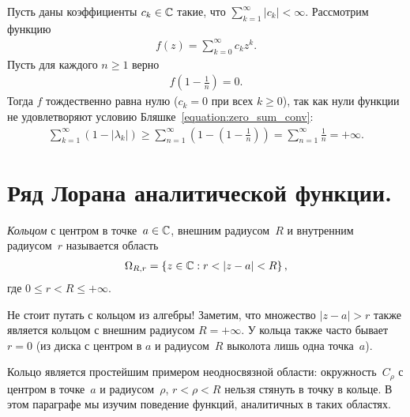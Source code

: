 \documentclass[../complex-analysis.tex]{subfiles}
\begin{document}
\begin{exmpl}
 Пусть даны коэффициенты $ c_k \in \mathbb{C} $ такие, что $ \sum_{k=1}^{\infty} \left| c_k \right| < \infty $. Рассмотрим функцию
 \begin{align*}
  f(z) = \sum_{k=0}^{\infty} c_k z^{k}.
 \end{align*} Пусть для каждого $ n \geqslant 1 $  верно
 \begin{align*}
  f \left( 1 - \frac{1}{n} \right) = 0.
 \end{align*} Тогда $ f $  тождественно равна нулю ($ c_k = 0 $ при всех $ k \geqslant 0 $), так как нули функции не удовлетворяют условию Бляшке~\eqref{equation:zero_sum_conv}:
 \begin{align*}
  \sum_{k=1}^{\infty} (1 - \left| \lambda_k \right|) \geqslant \sum_{n=1}^{\infty} \left( 1 - \left( 1 - \frac{1}{n} \right) \right) = \sum_{n=1}^{\infty} \frac{1}{n} = +\infty.
 \end{align*}
\end{exmpl}

\newpage
\section{Ряд Лорана аналитической функции.}

\begin{df}
 \label{def:Ring}
 \emph{Кольцом} с центром в точке~$ a\in\mathbb{C}$, внешним радиусом~$ R $ и внутренним радиусом~$ r $ называется область
 \begin{align*}
  \Omega_{R,r} = \left\{ z \in \mathbb{C} : r < \left| z-a \right| < R \right\},
 \end{align*} где $ 0 \leqslant r < R \leqslant +\infty $.
\end{df}

Не стоит путать с кольцом из алгебры! Заметим, что множество $ \left| z - a \right| > r $ также является кольцом с внешним радиусом $ R = +\infty $. У кольца также часто бывает $ r = 0 $ (из диска с центром в $ a $ и радиусом~$ R $ выколота лишь одна точка~$ a $).

Кольцо является простейшим примером неодносвязной области: окружность~$ C_\rho $ с центром в точке~$ a $ и радиусом~$ \rho $, $ r < \rho < R $ нельзя стянуть в точку в кольце. В этом параграфе мы изучим поведение функций, аналитичных в таких областях.
\end{document}

